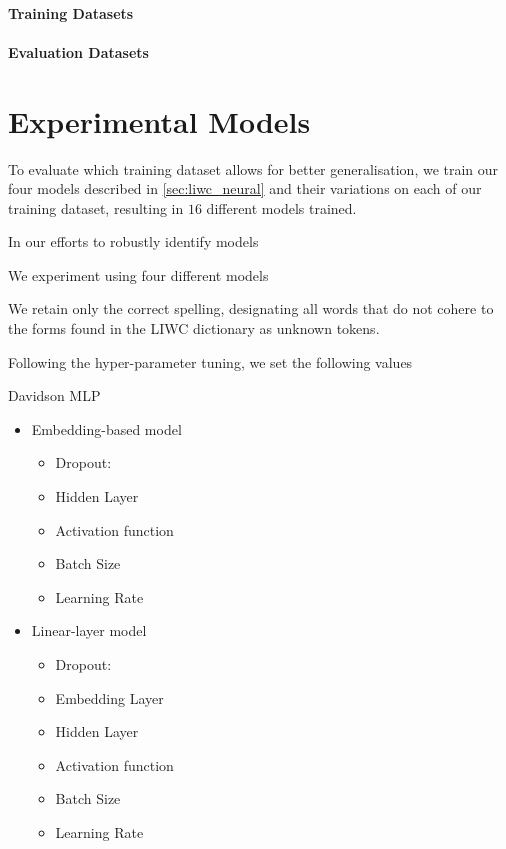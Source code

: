\paragraph{Training Datasets}

\paragraph{Evaluation Datasets}

\section{Experimental Models}

To evaluate which training dataset allows for better generalisation, we train our four models described in \autoref{sec:liwc_neural} and their variations on each of our training dataset, resulting in $16$ different models trained.

In our efforts to robustly identify models

We experiment using four different models

We retain only the correct spelling, designating all words that do not cohere to the forms found in the LIWC dictionary as unknown tokens.


Following the hyper-parameter tuning, we set the following values


Davidson MLP
\begin{itemize}
  \item Embedding-based model
    \begin{itemize}
      \item Dropout:
      \item Hidden Layer
      \item Activation function
      \item Batch Size
      \item Learning Rate
    \end{itemize}
  \item Linear-layer model
    \begin{itemize}
      \item Dropout:
      \item Embedding Layer
      \item Hidden Layer
      \item Activation function
      \item Batch Size
      \item Learning Rate
    \end{itemize}
\end{itemize}

